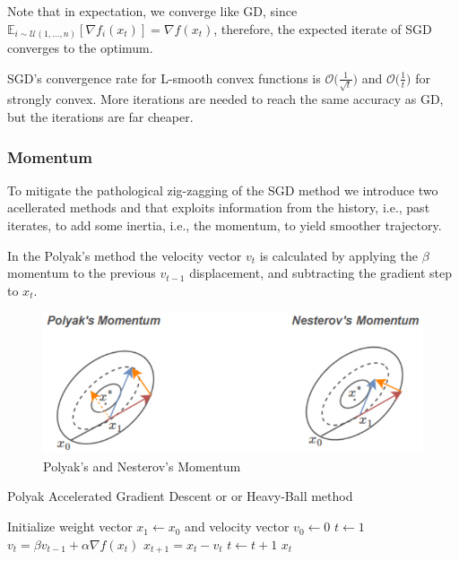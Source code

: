 Note that in expectation, we converge like GD, since $\displaystyle \mathbb{E}_{i \sim \mathcal{U}(1,\dots,n)}[\nabla f_i(x_t)] = \nabla f(x_t)$, therefore, the expected iterate of SGD converges to the optimum.

SGD’s convergence rate for L-smooth convex functions is $\displaystyle \mathcal{O}\Big(\frac{1}{\sqrt{t}}\Big)$ and $\displaystyle \mathcal{O}\Big(\frac{1}{t}\Big)$ for strongly convex. More iterations are needed to reach the same accuracy as GD, but the iterations are far cheaper.

\subsubsection{Momentum} 

To mitigate the pathological zig-zagging of the SGD method we introduce two acellerated methods \cite{polyak1964some} and \cite{nesterov1998introductory} that exploits information from the history, i.e., past iterates, to add some inertia, i.e., the momentum, to yield smoother trajectory.

In the Polyak's method \cite{polyak1964some} the velocity vector $v_t$ is calculated by applying the $\beta$ momentum to the previous $v_{t-1}$ displacement, and subtracting the gradient step to $x_t$.

\begin{figure}[h!]
	\centering
  	\includegraphics[scale=0.5]{img/momentum.png}
  	\caption{Polyak's and Nesterov's Momentum}
  	\label{fig:momentum}
\end{figure}

\begin{algorithm}[H]
	\caption{Polyak Accelerated Gradient Descent or or Heavy-Ball method}
	\label{alg:hbg}
	\begin{algorithmic}
		\Require{Momentum $\beta \in [0,1)$}
			\State Initialize weight vector $x_1 \gets x_0$ and velocity vector $v_0 \gets 0$
			\State $t \gets 1$
				\State $v_t = \beta v_{t-1} + \alpha \nabla f(x_t)$
				\State $x_{t+1} = x_t - v_t$
				\State $t \gets t + 1$
			\EndWhile
			\State \Return $x_t$
		\EndFunction
	\end{algorithmic}
\end{algorithm}

